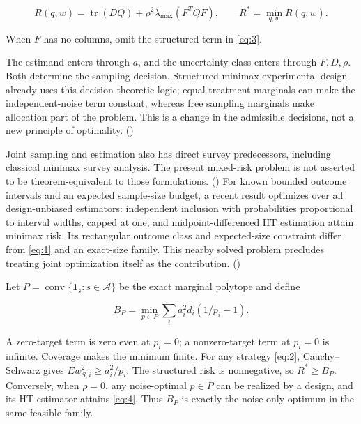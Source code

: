 \documentclass[11pt]{article}
\begin{document}
\begin{equation}\label{eq:3}
R(q,w)=\operatorname{tr}(DQ)+
\rho^2\lambda_{\max}(F^TQF),\qquad
R^*=\min_{q,w}R(q,w). 
\end{equation}

When \(F\) has no columns, omit the structured term in \eqref{eq:3}.

The estimand enters through \(a\), and the uncertainty class enters
through \(F,D,\rho\). Both determine the sampling decision. Structured
minimax experimental design already uses this decision-theoretic logic;
equal treatment marginals can make the independent-noise term constant,
whereas free sampling marginals make allocation part of the problem.
This is a change in the admissible decisions, not a new principle of
optimality. (\citealp[Section 2]{Kallus2020})

Joint sampling and estimation also has direct survey predecessors,
including classical minimax survey analysis. The present mixed-risk
problem is not asserted to be theorem-equivalent to those formulations.
(\citealp{ChengLi1983}) For known bounded outcome intervals
and an expected sample-size budget, a recent result optimizes over all
design-unbiased estimators: independent inclusion with probabilities
proportional to interval widths, capped at one, and midpoint-differenced
HT estimation attain minimax risk. Its rectangular outcome class and
expected-size constraint differ from \eqref{eq:1} and an exact-size
family. This nearby solved problem precludes treating joint optimization
itself as the contribution.
(\citealp[Theorems 1--3]{AronowLopatto2026})

Let \(P=\operatorname{conv}\{\mathbf1_s:s\in\mathcal A\}\) be the exact
marginal polytope and define

\begin{equation}\label{eq:4}
B_P=\min_{p\in P}\sum_i a_i^2d_i(1/p_i-1). 
\end{equation}

A zero-target term is zero even at \(p_i=0\); a nonzero-target term at
\(p_i=0\) is infinite. Coverage makes the minimum finite. For any
strategy \eqref{eq:2}, Cauchy--Schwarz gives
\(Ew_{S,i}^2\ge a_i^2/p_i\). The structured risk is nonnegative, so
\(R^*\ge B_P\). Conversely, when \(\rho=0\), any noise-optimal
\(p\in P\) can be realized by a design, and its HT estimator attains
\eqref{eq:4}. Thus \(B_P\) is exactly the noise-only optimum in the same
feasible family.
\end{document}
